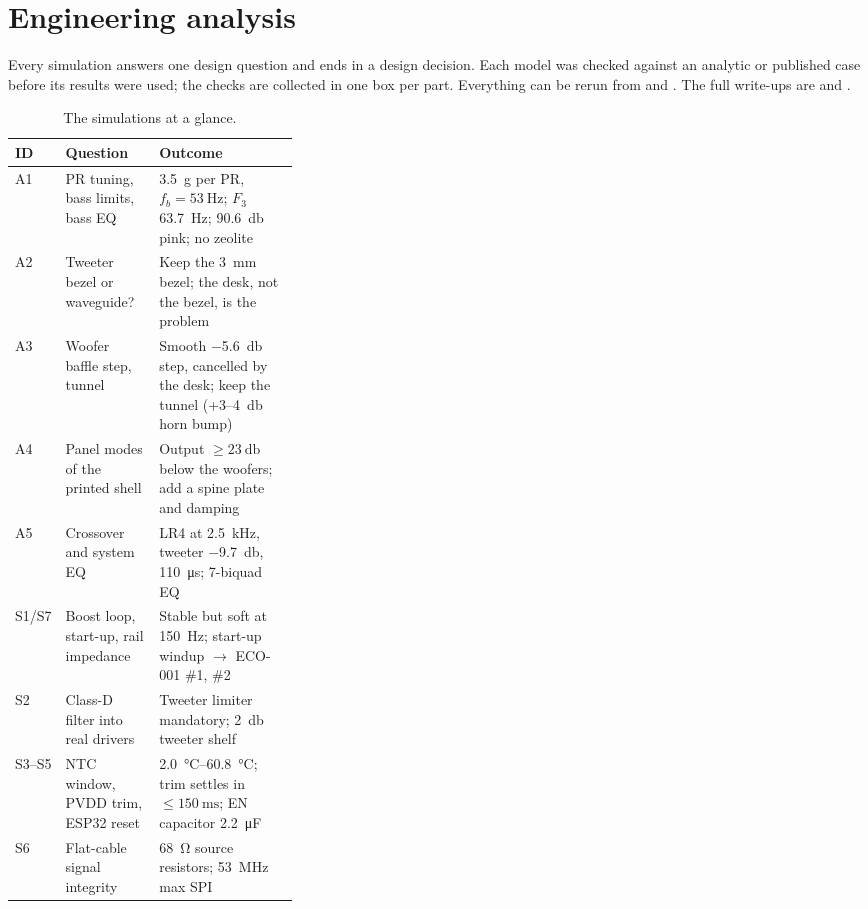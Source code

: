 \section{Engineering analysis}\label{sec:analysis}

Every simulation answers one design question and ends in a design decision. Each model was checked against an analytic or published case before its results were used; the checks are collected in one box per part. Everything can be rerun from  and . The full write-ups are  and .

\begin{table}[htbp]
\centering\small
\caption{The simulations at a glance.}
\label{tab:sim-summary}
\begin{tabularx}{\linewidth}{@{}l >{\raggedright\arraybackslash}p{0.33\linewidth} >{\raggedright\arraybackslash}X@{}}
\toprule
ID & Question & Outcome \\
\midrule
A1 & PR tuning, bass limits, bass EQ & \qty{3.5}{\gram} per PR, $f_b=\qty{53}{\hertz}$; $F_3$ \qty{63.7}{\hertz}; \qty{90.6}{\decibel} pink; no zeolite \\
A2 & Tweeter bezel or waveguide? & Keep the \qty{3}{\milli\metre} bezel; the desk, not the bezel, is the problem \\
A3 & Woofer baffle step, tunnel & Smooth \qty{-5.6}{\decibel} step, cancelled by the desk; keep the tunnel (+3--\qty{4}{\decibel} horn bump) \\
A4 & Panel modes of the printed shell & Output $\ge\qty{23}{\decibel}$ below the woofers; add a spine plate and damping \\
A5 & Crossover and system EQ & LR4 at \qty{2.5}{\kilo\hertz}, tweeter \qty{-9.7}{\decibel}, \qty{+110}{\micro\second}; 7-biquad EQ \\
S1/S7 & Boost loop, start-up, rail impedance & Stable but soft at \qty{150}{\hertz}; start-up windup $\to$ ECO-001 \#1, \#2 \\
S2 & Class-D filter into real drivers & Tweeter limiter mandatory; \qty{+2}{\decibel} tweeter shelf \\
S3--S5 & NTC window, PVDD trim, ESP32 reset & \qtyrange{2.0}{60.8}{\degreeCelsius}; trim settles in $\le\qty{150}{\milli\second}$; EN capacitor \qty{2.2}{\micro\farad} \\
S6 & Flat-cable signal integrity & \qty{68}{\ohm} source resistors; \qty{53}{\mega\hertz} max SPI \\
\bottomrule
\end{tabularx}
\end{table}

